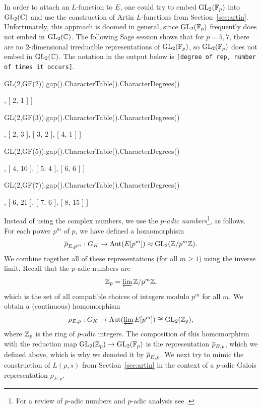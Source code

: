 In order to attach an $L$-function to $E$, one could try to embed
$\operatorname{GL}_2(\mathbb{F}_p)$ into $\operatorname{GL}_2(\mathbb{C})$ and use the construction of Artin
$L$-functions from Section~\ref{sec:artin}.
Unfortunately, this approach is doomed in general, since
$\operatorname{GL}_2(\mathbb{F}_p)$ frequently does not embed in $\operatorname{GL}_2(\mathbb{C})$.
The following Sage session shows that for $p=5,7$, there are
no 2-dimensional irreducible representations of $\operatorname{GL}_2(\mathbb{F}_p)$,
so $\operatorname{GL}_2(\mathbb{F}_p)$ does not embed in $\operatorname{GL}_2(\mathbb{C})$.
The notation in the output below is
{\tt [degree of rep, number of times it occurs]}.
\begin{sagecode}
\begin{sagecell}
GL(2,GF(2)).gap().CharacterTable().CharacterDegrees()
\end{sagecell}
\begin{sageout}
[ [ 1, 2 ], [ 2, 1 ] ]
\end{sageout}
\begin{sagecell}
GL(2,GF(3)).gap().CharacterTable().CharacterDegrees()
\end{sagecell}
\begin{sageout}
[ [ 1, 2 ], [ 2, 3 ], [ 3, 2 ], [ 4, 1 ] ]
\end{sageout}
\begin{sagecell}
GL(2,GF(5)).gap().CharacterTable().CharacterDegrees()
\end{sagecell}
\begin{sageout}
[ [ 1, 4 ], [ 4, 10 ], [ 5, 4 ], [ 6, 6 ] ]
\end{sageout}
\begin{sagecell}
GL(2,GF(7)).gap().CharacterTable().CharacterDegrees()
\end{sagecell}
\begin{sageout}
[ [ 1, 6 ], [ 6, 21 ], [ 7, 6 ], [ 8, 15 ] ]
\end{sageout}
\end{sagecode}

Instead of using the complex numbers, we use the
\emph{$p$-adic numbers}\footnote{
For a review of $p$-adic numbers and $p$-adic analysis
see \cite{koblitz1996p}.
}, as
follows.  For each power $p^m$ of $p$, we have defined a homomorphism
$$
  \overline{\rho}_{E,p^m}: G_K \to \operatorname{Aut}(E[p^m]) \approx \operatorname{GL}_2(\mathbb{Z}/p^m\mathbb{Z}).
$$
We combine together all of these representations (for all $m\geq 1$)
using the inverse limit.
Recall that the $p$-adic numbers are
$$
  \mathbb{Z}_p = \varprojlim \mathbb{Z}/p^m\mathbb{Z},
$$
which is the set of all compatible choices of integers modulo $p^m$ for
all $m$.
We obtain a (continuous) homomorphism
$$
  \rho_{E,p}: G_K \to \operatorname{Aut}(\varprojlim E[p^m]) \cong \operatorname{GL}_2(\mathbb{Z}_p),
$$
where $\mathbb{Z}_p$ is the ring of $p$-adic integers.  The composition of
this homomorphism with the reduction map $\operatorname{GL}_2(\mathbb{Z}_p) \to \operatorname{GL}_2(\mathbb{F}_p)$
is the representation $\overline{\rho}_{E,p}$, which we defined above, which
is why we denoted it by $\overline{\rho}_{E,p}$. We
next try to mimic the construction of $L(\rho,s)$ from
Section~\ref{sec:artin} in the context of a $p$-adic Galois
representation $\rho_{E,p}$.

